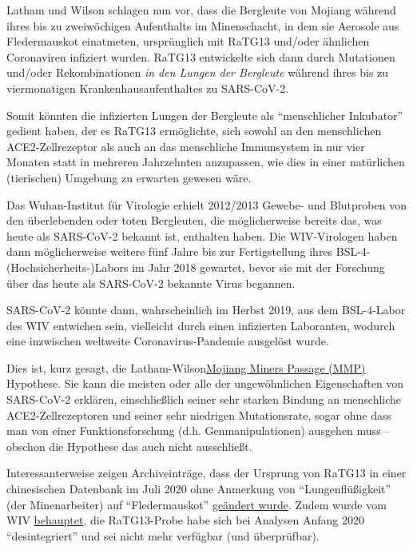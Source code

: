 Latham und Wilson schlagen nun vor, dass die Bergleute von Mojiang
während ihres bis zu zweiwöchigen Aufenthalts im Minenschacht, in dem
sie Aerosole aus Fledermauskot einatmeten, ursprünglich mit RaTG13
und/oder ähnlichen Coronaviren infiziert wurden. RaTG13 entwickelte sich
dann durch Mutationen und/oder Rekombinationen \emph{in den Lungen der
Bergleute} während ihres bis zu viermonatigen Krankenhausaufenthaltes zu
SARS-CoV-2.

Somit könnten die infizierten Lungen der Bergleute als ``menschlicher
Inkubator'' gedient haben, der es RaTG13 ermöglichte, sich sowohl an den
menschlichen ACE2-Zellrezeptor als auch an das menschliche Immunsystem
in nur vier Monaten statt in mehreren Jahrzehnten anzupassen, wie dies
in einer natürlichen (tierischen) Umgebung zu erwarten gewesen wäre.

Das Wuhan-Institut für Virologie erhielt 2012/2013 Gewebe- und
Blutproben von den überlebenden oder toten Bergleuten, die
möglicherweise bereits das, was heute als SARS-CoV-2 bekannt ist,
enthalten haben. Die WIV-Virologen haben dann möglicherweise weitere
fünf Jahre bis zur Fertigstellung ihres BSL-4-(Hochsicherheits-)Labors
im Jahr 2018 gewartet, bevor sie mit der Forschung über das heute als
SARS-CoV-2 bekannte Virus begannen.

SARS-CoV-2 könnte dann, wahrscheinlich im Herbst 2019, aus dem
BSL-4-Labor des WIV entwichen sein, vielleicht durch einen infizierten
Laboranten, wodurch eine inzwischen weltweite Coronavirus-Pandemie
ausgelöst wurde.

Dies ist, kurz gesagt, die
Latham-Wilson\href{https://www.independentsciencenews.org/commentaries/a-proposed-origin-for-sars-cov-2-and-the-covid-19-pandemic/}{Mojiang
Miners Passage (MMP)} Hypothese. Sie kann die meisten oder alle der
ungewöhnlichen Eigenschaften von SARS-CoV-2 erklären, einschließlich
seiner sehr starken Bindung an menschliche ACE2-Zellrezeptoren und
seiner sehr niedrigen Mutationsrate, sogar ohne dass man von einer
Funktionsforschung (d.h. Genmanipulationen) ausgehen muss -- obschon die
Hypothese das auch nicht ausschließt.

Interessanterweise zeigen Archiveinträge, dass der Ursprung von RaTG13
in einer chinesischen Datenbank im Juli 2020 ohne Anmerkung von
``Lungenflüßigkeit'' (der Minenarbeiter) auf ``Fledermauskot''
\href{https://twitter.com/TheSeeker268/status/1286327367019839490}{geändert
wurde}. Zudem wurde vom WIV
\href{https://www.thetimes.co.uk/article/seven-year-covid-trail-revealed-l5vxt7jqp}{behauptet},
die RaTG13-Probe habe sich bei Analysen Anfang 2020 ``desintegriert''
und sei nicht mehr verfügbar (und überprüfbar).

